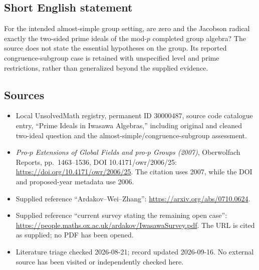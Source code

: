 \documentclass[11pt]{article}
\begin{document}
\subsection{Short English statement}
For the intended almost-simple group setting, are zero and the Jacobson radical exactly the two-sided prime ideals of the mod-\(p\) completed group algebra? The source does not state the essential hypotheses on the group. Its reported congruence-subgroup case is retained with unspecified level and prime restrictions, rather than generalized beyond the supplied evidence.
\subsection{Sources}
\begin{itemize}
\item Local UnsolvedMath registry, permanent ID 30000487, source code catalogue entry, ``Prime Ideals in Iwasawa Algebras,'' including original and cleaned two-ideal question and the almost-simple/congruence-subgroup assessment.
\item \emph{Pro-\(p\) Extensions of Global Fields and pro-\(p\) Groups (2007)}, Oberwolfach Reports, pp.\ 1463--1536, DOI 10.4171/owr/2006/25: \url{https://doi.org/10.4171/owr/2006/25}. The citation uses 2007, while the DOI and proposed-year metadata use 2006.
\item Supplied reference ``Ardakov--Wei--Zhang'': \url{https://arxiv.org/abs/0710.0624}.
\item Supplied reference ``current survey stating the remaining open case'': \url{https://people.maths.ox.ac.uk/ardakov/IwasawaSurvey.pdf}. The URL is cited as supplied; no PDF has been opened.
\item Literature triage checked 2026-08-21; record updated 2026-09-16. No external source has been visited or independently checked here.
\end{itemize}
\end{document}
